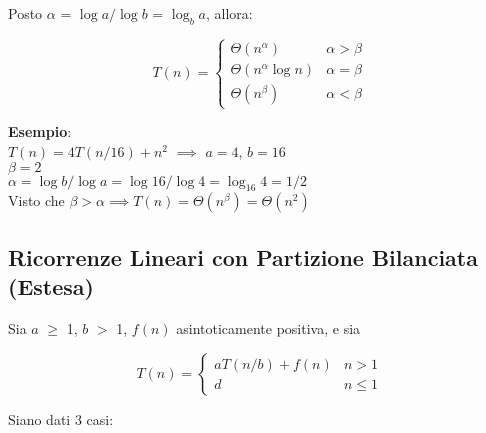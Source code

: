\documentclass[../cheatSheetAlgoritmi.tex]{subfiles}
\begin{document}
Posto $\alpha$ = $\log{a}/\log{b}$ = $\log_{b}{a}$, allora:
\begin{center}
	\begin{equation*}
  		T(n)=\begin{cases}
			\Theta(n^{\alpha}) & \text{$\alpha > \beta$}\\
    		\Theta(n^{\alpha} \log{n}) & \text{$\alpha = \beta$}\\
    		\Theta(n^{\beta}) & \text{$\alpha < \beta$}
  		\end{cases}
	\end{equation*}
\end{center}
\textbf{Esempio}:\\
$T(n) = 4T(n/16) + n^{2}$ $\implies$ $a = 4$, $b = 16$\\
$\beta = 2$\\
$\alpha = \log{b} / \log{a} = \log{16} / \log{4} = \log_{16}{4} = 1/2$\\
Visto che $\beta > \alpha \implies T(n) = \Theta(n^{\beta}) = \Theta(n^{2})$ 
\newpage

\subsection{Ricorrenze Lineari con Partizione Bilanciata (Estesa)}
Sia $a$ $\geq$ 1, $b$ $>$ 1, $f(n)$ asintoticamente positiva, e sia 
\begin{center}
	\begin{equation*}
  		T(n)=\begin{cases}
    		aT(n/b) + f(n) & \text{$n > 1$}\\
    		d & \text{$n \leq 1$}
  		\end{cases}
	\end{equation*}
\end{center}

Siano dati 3 casi:
\end{document}
